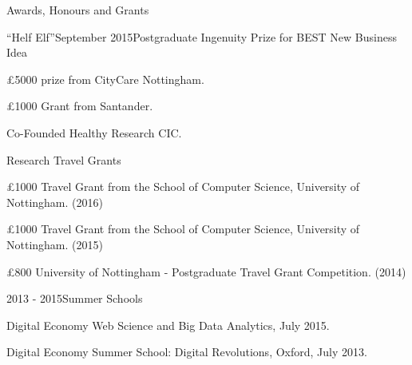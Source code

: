 \documentclass{resume} %
\begin{document}
\begin{rSection}{Awards, Honours and Grants}
    \begin{rSubsection}{``Helf Elf''}{September 2015}{Postgraduate Ingenuity Prize for BEST New Business Idea}{}
        \item \pounds 5000 prize from CityCare Nottingham.
        \item \pounds 1000 Grant from Santander.
        \item Co-Founded Healthy Research CIC.
    \end{rSubsection}
    \begin{rSubsection}{}{}{Research Travel Grants}{}
        \item \pounds 1000 Travel Grant from the School of Computer Science, University of Nottingham. (2016)
        \item \pounds 1000 Travel Grant from the School of Computer Science, University of Nottingham. (2015)
        \item \pounds 800 University of Nottingham - Postgraduate Travel Grant Competition. (2014)
    \end{rSubsection}
    \begin{rSubsection}{}{2013 - 2015}{Summer Schools}{}
        \item Digital Economy Web Science and Big Data Analytics, July 2015.
        \item Digital Economy Summer School: Digital Revolutions, Oxford, July 2013.
    \end{rSubsection}

\end{rSection}

\end{document}
